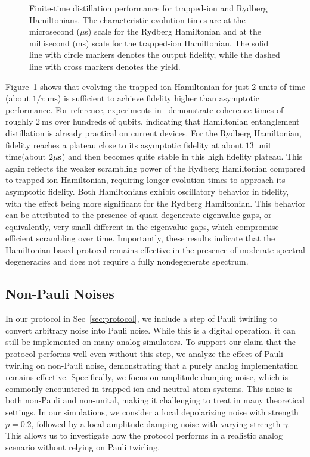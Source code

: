 \documentclass[onecolumn,prx,longbibliography,nofootinbib, superscriptaddress]{revtex4-2}
\theoremstyle{recap}
\begin{document}
\begin{figure}[htbp]
    \centering
    
    \caption{Finite-time distillation performance for trapped-ion and Rydberg Hamiltonians. The characteristic evolution times are at the microsecond ($\mu$s) scale for the Rydberg Hamiltonian and at the millisecond (ms) scale for the trapped-ion Hamiltonian. The solid line with circle markers denotes the output fidelity, while the dashed line with cross markers denotes the yield.}
    \label{fig:finite-time}
\end{figure}

Figure~\ref{fig:finite-time} shows that evolving the trapped-ion Hamiltonian for just 2 units of time (about $1/\pi~\mathrm{ms}$) is sufficient to achieve fidelity higher than asymptotic performance. For reference, experiments in~\cite{Guo2024} demonstrate coherence times of roughly $2~\mathrm{ms}$ over hundreds of qubits, indicating that Hamiltonian entanglement distillation is already practical on current devices. For the Rydberg Hamiltonian, fidelity reaches a plateau close to its asymptotic fidelity at about $13$ unit time(about $2\rm{\mu}s$) and then becomes quite stable in this high fidelity plateau. This again reflects the weaker scrambling power of the Rydberg Hamiltonian compared to trapped-ion Hamiltonian, requiring longer evolution times to approach its asymptotic fidelity. Both Hamiltonians exhibit oscillatory behavior in fidelity, with the effect being more significant for the Rydberg Hamiltonian. This behavior can be attributed to the presence of quasi-degenerate eigenvalue gaps, or equivalently, very small different in the eigenvalue gaps, which compromise efficient scrambling over time. Importantly, these results indicate that the Hamiltonian-based protocol remains effective in the presence of moderate spectral degeneracies and does not require a fully nondegenerate spectrum.  

\subsection{Non-Pauli Noises}\label{subsec:non-Pauli}
In our protocol in Sec~\ref{sec:protocol}, we include a step of Pauli twirling to convert arbitrary noise into Pauli noise. While this is a digital operation, it can still be implemented on many analog simulators. To support our claim that the protocol performs well even without this step, we analyze the effect of Pauli twirling on non-Pauli noise, demonstrating that a purely analog implementation remains effective. Specifically, we focus on amplitude damping noise, which is commonly encountered in trapped-ion and neutral-atom systems. This noise is both non-Pauli and non-unital, making it challenging to treat in many theoretical settings. In our simulations, we consider a local depolarizing noise with strength $p = 0.2$, followed by a local amplitude damping noise with varying strength $\gamma$. This allows us to investigate how the protocol performs in a realistic analog scenario without relying on Pauli twirling.
\end{document}
